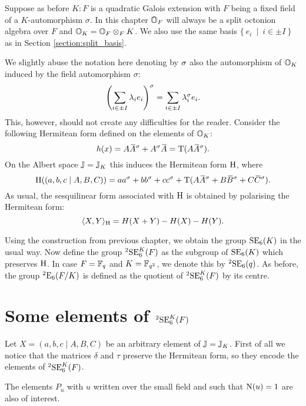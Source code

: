 Suppose as before $K : F$ is a quadratic Galois extension with $F$ being a fixed field of a
$K$-automorphism $\sigma$. In this chapter $\mathbb{O}_F$ will always be a split octonion algebra 
over $F$ and $\mathbb{O}_K = \mathbb{O}_F \otimes_F K$. We also use the same basis 
$\{\ e_i\ \mid\ i \in \pm I\ \}$ as in Section \ref{section:split_basis}.

We slightly abuse the notation here denoting by $\sigma$ also the automorphism of $\mathbb{O}_K$ induced by 
the field automorphism $\sigma$:
\begin{equation}
	\left( \sum_{i\in \pm I} \lambda_i e_i \right)^{\sigma} = 
	\sum_{i\in \pm I} \lambda_{i}^{\sigma} e_i. 
\end{equation}
This, however, should not create any difficulties for the reader. 
Consider the following Hermitean form defined on the elements of $\mathbb{O}_K$:
\begin{equation}
	h(x) = A \ovA^{\s} + A^{\s} \ovA = \Tr(A \ovA^{\s}).
\end{equation}
On the Albert space $\mathbb{J} = \mathbb{J}_K$ this induces the Hermitean form $\mathrm{H}$, where
\begin{equation}
	\H( (a,b,c\mid A,B,C) ) = 
		a a^{\s} + b b^{\s} + c c^{\s} + 
		\Tr(A \ovA^{\s} + B\ovB^{\s} + C\ovC^{\s}).
\end{equation}
As usual, the sesquilinear form associated with $\mathrm{H}$ is obtained by polarising the Hermitean form:
\begin{equation}
	\langle X, Y \rangle_{\mathrm{H}} = H(X+Y) - H(X) - H(Y).
\end{equation}

Using the construction from previous chapter, we obtain the group $\mathrm{SE}_6(K)$ in the usual 
way. Now define the group ${}^2\mathrm{SE}_6^K(F)$ as the subgroup of $\mathrm{SE}_6(K)$ which preserves 
$\mathrm{H}$. In case $F = \mathbb{F}_q$ and $K = \mathbb{F}_{q^2}$, we denote this by ${}^2\mathrm{SE}_6(q)$. As before,
the group ${}^2\mathrm{E}_6(F/K)$ is defined as the quotient of ${}^2\mathrm{SE}_6^K(F)$ by its centre. 

\section{Some elements of ${}^2\mathrm{SE}_6^K(F)$}

Let $X = (a,b,c\mid A,B,C)$ be an arbitrary element of $\mathbb{J} = \mathbb{J}_K$. First of all we notice that 
the matrices $\delta$ and $\tau$ preserve the Hermitean form, so they encode the elements of 
${}^2\mathrm{SE}_6^K(F)$.

The elements $P_u$ with $u$ written over the small field and 
such that $\mathord{\mathrm{N}}(u) = 1$ are also of interest. 

